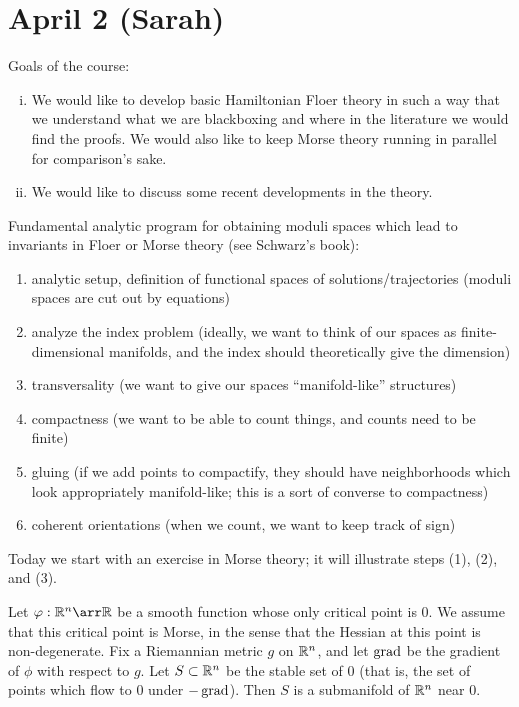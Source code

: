 \section*{\textbf{April 2 (Sarah)}}
Goals of the course:
\begin{enumerate}[(i)]
\item We would like to develop basic Hamiltonian Floer theory in such a way that we understand what we are blackboxing and where in the literature we would find the proofs. We would also like to keep Morse theory running in parallel for comparison's sake.

\item We would like to discuss some recent developments in the theory.
\end{enumerate}

Fundamental analytic program for obtaining moduli spaces which lead to invariants in Floer or Morse theory (see Schwarz's book):
\begin{enumerate}[(1)]
\item analytic setup, definition of functional spaces of solutions/trajectories (moduli spaces are cut out by equations)

\item analyze the index problem (ideally, we want to think of our spaces as finite-dimensional manifolds, and the index should theoretically give the dimension)

\item transversality (we want to give our spaces ``manifold-like'' structures)

\item compactness (we want to be able to count things, and counts need to be finite)

\item gluing (if we add points to compactify, they should have neighborhoods which look appropriately manifold-like; this is a sort of converse to compactness)

\item coherent orientations (when we count, we want to keep track of sign)
\end{enumerate}

\bigskip

Today we start with an exercise in Morse theory; it will illustrate steps (1), (2), and (3).

\begin{thm}
Let $\varphi:\R^n\arr\R$ be a smooth function whose only critical point is $0$. We assume that this critical point is Morse, in the sense that the Hessian at this point is non-degenerate. Fix a Riemannian metric $g$ on $\mathbb{R}^n$, and let $\operatorname{grad}$ be the gradient of $\phi$ with respect to $g$. Let $S \subset \mathbb{R}^n$ be the stable set of $0$ (that is, the set of points which flow to $0$ under $-\operatorname{grad}$). Then $S$ is a submanifold of $\mathbb{R}^n$ near $0$.
\end{thm}

